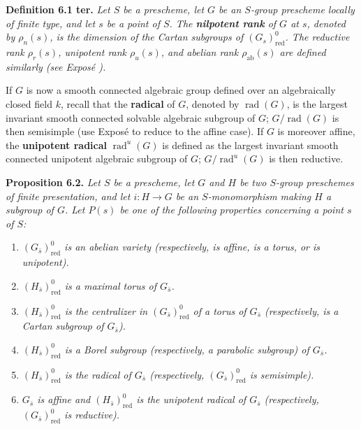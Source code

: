 \textbf{Definition 6.1 ter.} \emph{Let \(S\) be a prescheme, let
\(G\) be an \(S\)-group prescheme locally of finite type, and let
\(s\) be a point of \(S\). The \textbf{nilpotent rank} of \(G\) at
\(s\), denoted by \(\rho_n(s)\), is the dimension of the Cartan
subgroups of \((G_s)^0_{\mathrm{red}}\). The reductive rank
\(\rho_r(s)\), unipotent rank \(\rho_u(s)\), and abelian rank
\(\rho_{\mathrm{ab}}(s)\) are defined similarly (see Exposé
).}

If \(G\) is now a smooth connected algebraic group defined over an
algebraically closed field \(k\), recall that the \textbf{radical}
of \(G\), denoted by \(\operatorname{rad}(G)\), is the largest
invariant smooth connected solvable algebraic subgroup of \(G\);
\(G/\operatorname{rad}(G)\) is then semisimple (use Exposé 
to reduce to the affine case). If \(G\) is moreover affine, the
\textbf{unipotent radical} \(\operatorname{rad}^{u}(G)\) is defined
as the largest invariant smooth connected unipotent algebraic
subgroup of \(G\); \(G/\operatorname{rad}^{u}(G)\) is then
reductive.

\textbf{Proposition 6.2.} \emph{Let \(S\) be a prescheme, let \(G\)
and \(H\) be two \(S\)-group preschemes of finite presentation, and
let \(i:H\to G\) be an \(S\)-monomorphism making \(H\) a subgroup
of \(G\). Let \(P(s)\) be one of the following properties concerning
a point \(s\) of \(S\):}

\begin{enumerate}
\renewcommand{\labelenumi}{\textup{\roman{enumi})}}
\item \emph{\((G_{\bar s})^{0}_{\mathrm{red}}\) is an abelian
variety (respectively, is affine, is a torus, or is unipotent).}
\item \emph{\((H_{\bar s})^{0}_{\mathrm{red}}\) is a maximal torus
of \(G_{\bar s}\).}
\item{} \emph{\((H_{\bar s})^{0}_{\mathrm{red}}\) is the centralizer
in \((G_{\bar s})^{0}_{\mathrm{red}}\) of a torus of \(G_{\bar s}\)
(respectively, is a Cartan subgroup of \(G_{\bar s}\)).}
\item \emph{\((H_{\bar s})^{0}_{\mathrm{red}}\) is a Borel subgroup
(respectively, a parabolic subgroup) of \(G_{\bar s}\).}
\item \emph{\((H_{\bar s})^{0}_{\mathrm{red}}\) is the radical of
\(G_{\bar s}\) (respectively,
\((G_{\bar s})^{0}_{\mathrm{red}}\) is semisimple).}
\item \emph{\(G_{\bar s}\) is affine and
\((H_{\bar s})^{0}_{\mathrm{red}}\) is the unipotent radical of
\(G_{\bar s}\) (respectively,
\((G_{\bar s})^{0}_{\mathrm{red}}\) is reductive).}
\end{enumerate}

